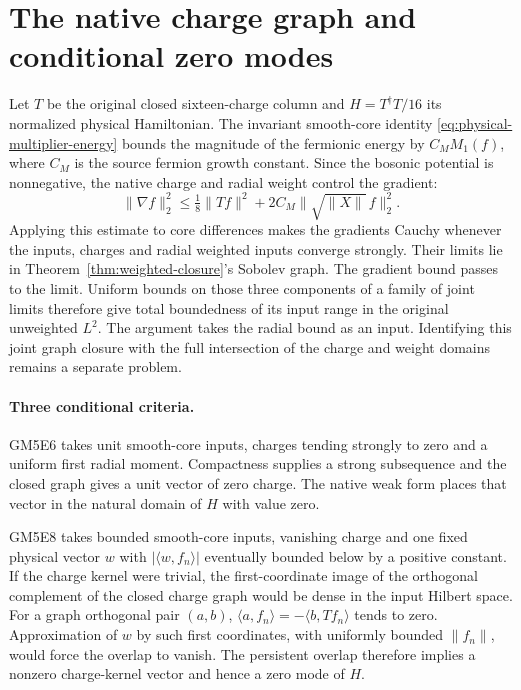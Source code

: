 \section{The native charge graph and conditional zero modes}
\label{sec:conditional-zero-mode-criteria}
Let \(T\) be the original closed sixteen-charge column and
\(H=T^\dagger T/16\) its normalized physical Hamiltonian. The
invariant smooth-core identity
\eqref{eq:physical-multiplier-energy} bounds the magnitude of the
fermionic energy by \(C_M M_1(f)\), where \(C_M\) is the source
fermion growth constant. Since the bosonic potential is nonnegative,
the native charge and radial weight control the gradient:
\[
 \|\nabla f\|_2^2
 \le \tfrac18\|Tf\|^2+2C_M\|\sqrt{\|X\|}\,f\|_2^2 .
\]
Applying this estimate to core differences makes the gradients Cauchy
whenever the inputs, charges and radial weighted inputs converge strongly.
Their limits lie in Theorem~\ref{thm:weighted-closure}'s Sobolev graph.
The gradient bound passes to the limit. Uniform bounds on those three
components of a family of joint limits therefore give total boundedness
of its input range in the original unweighted \(L^2\).
The argument takes the radial bound as an input. Identifying this joint
graph closure with the full intersection of the charge and weight domains
remains a separate problem.


\paragraph{Three conditional criteria.}
GM5E6 takes unit smooth-core inputs, charges tending strongly to zero
and a uniform first radial moment. Compactness supplies a strong
subsequence and the closed graph gives a unit vector of zero charge.
The native weak form places that vector in the natural domain of \(H\)
with value zero.

GM5E8 takes bounded smooth-core inputs, vanishing charge and one fixed
physical vector \(w\) with \(\lvert\langle w,f_n\rangle\rvert\) eventually
bounded below by a positive constant. If the charge kernel were trivial,
the first-coordinate image of the orthogonal complement of the closed
charge graph would be dense in the input Hilbert space. For a graph
orthogonal pair \((a,b)\), \(\langle a,f_n\rangle=-\langle b,Tf_n\rangle\)
tends to zero. Approximation of \(w\) by such first coordinates, with
uniformly bounded \(\|f_n\|\), would force the overlap to vanish.
The persistent overlap therefore implies a nonzero charge-kernel vector
and hence a zero mode of \(H\).

